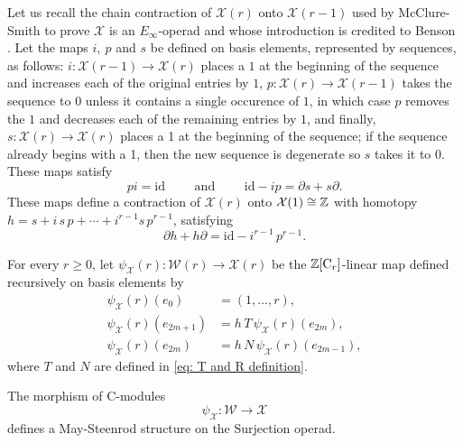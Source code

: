 Let us recall the chain contraction of $\mathcal X(r)$ onto $\mathcal X(r-1)$ used by McClure-Smith to prove $\mathcal X$ is an $E_\infty$-operad and whose introduction is credited to Benson \cite{benson1998rep}. Let the maps $i,\ p$ and $s$ be defined on basis elements, represented by sequences, as follows: $i : \mathcal X(r-1) \to \mathcal X(r)$ places a $1$ at the beginning of the sequence and increases each of the original entries by $1$, $p : \mathcal X(r) \to \mathcal X(r-1)$ takes the sequence to $0$ unless it contains a single occurence of $1$, in which case $p$ removes the $1$ and decreases each of the remaining entries by $1$, and finally, $s : \mathcal X(r) \to \mathcal X(r)$ places a 1 at the beginning of the sequence; if the sequence already begins
with a 1, then the new sequence is degenerate so $s$ takes it to $0$. These maps satisfy
\begin{equation*}
p  i = \mathrm{id}
\qquad \text{ and } \qquad
\mathrm{id} - i  p = \partial s + s \partial.
\end{equation*}
These maps define a contraction of $\mathcal X(r)$ onto $\mathcal X(1) \cong \mathbb{Z}$ with homotopy $h = s + i\, s\, p + \cdots + i^{r-1} s\, p^{r-1}$, satisfying
\begin{equation*}
\partial h + h \partial = \mathrm{id} - i^{r-1}\,p^{r-1}.
\end{equation*}

\begin{definition} \label{def: Steenrod-Adem on surjection}
	For every $r \geq 0$, let $\psi_{\mathcal X}(r) : \mathcal W(r) \to \mathcal X(r)$ be the $\mathbb{Z}[\mathrm{C}_r]$-linear map defined recursively on basis elements by
	\begin{align*}
	\psi_{\mathcal X}(r)(e_0) & = (1, \dots, r), \\
	\psi_{\mathcal X}(r)(e_{2m+1}) & = h\,T\,\psi_{\mathcal X}(r)(e_{2m}), \\
	\psi_{\mathcal X}(r)(e_{2m}) & = h\,N\,\psi_{\mathcal X}(r)(e_{2m-1}),
	\end{align*}
	where $T$ and $N$ are defined in \eqref{eq: T and R definition}.
\end{definition}

\begin{theorem} \label{thm: Steenrod-Adem on surjection MS convention}
	The morphism of $\mathrm{C}$-modules
	\begin{equation*}
	\psi_{\mathcal X} \colon \mathcal W \to \mathcal X
	\end{equation*}
	defines a May-Steenrod structure on the Surjection operad.
\end{theorem}

